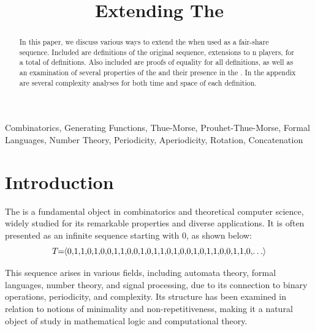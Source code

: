 \documentclass[conference]{IEEEtran}
\begin{document}
\title{Extending The \TMS}

\author{
}

\maketitle

\begin{abstract}
In this paper, we discuss various ways to extend the \TMS \cite{OEIS-TMS} when used as a fair-share sequence. Included are \TotalOriginals definitions of the original sequence, \TotalExtensions extensions to n players, for a total of \TotalDefs definitions. Also included are proofs of equality for all definitions, as well as an examination of several properties of the \TMS and their presence in the \ETMS. In the appendix are several complexity analyses for both time and space of each definition.
\end{abstract}

\begin{IEEEkeywords}
Combinatorics, Generating Functions, Thue-Morse, Prouhet-Thue-Morse, Formal Languages, Number Theory, Periodicity, Aperiodicity, Rotation, Concatenation
\end{IEEEkeywords}

\section{Introduction}

The \TMS is a fundamental object in combinatorics and theoretical computer science, widely studied for its remarkable properties and diverse applications. It is often presented as an infinite sequence starting with 0, as shown below: \begin{equation*}
T\!\!=\!\!\tuple{0,\!1,\!1,\!0,\!1,\!0,\!0,\!1,\!1,\!0,\!0,\!1,\!0,\!1,\!1,\!0,\!1,\!0,\!0,\!1,\!0,\!1,\!1,\!0,\!0,\!1,\!1,\!0,\!\ldots}
\end{equation*}

This sequence arises in various fields, including automata theory, formal languages, number theory, and signal processing, due to its connection to binary operations, periodicity, and complexity. Its structure has been examined in relation to notions of minimality and non-repetitiveness, making it a natural object of study in mathematical logic and computational theory.
\end{document}
